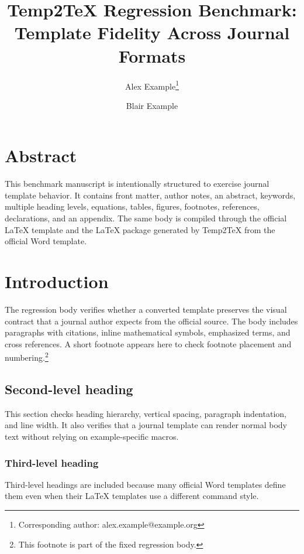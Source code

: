 \title{Temp2TeX Regression Benchmark: Template Fidelity Across Journal Formats}
\author{Alex Example\thanks{Corresponding author: alex.example@example.org} \and Blair Example}
\date{}
\maketitle

\section*{Abstract}
This benchmark manuscript is intentionally structured to exercise journal template behavior. It contains front matter, author notes, an abstract, keywords, multiple heading levels, equations, tables, figures, footnotes, references, declarations, and an appendix. The same body is compiled through the official LaTeX template and the LaTeX package generated by Temp2TeX from the official Word template.


\section{Introduction}
The regression body verifies whether a converted template preserves the visual contract that a journal author expects from the official source. The body includes paragraphs with citations, inline mathematical symbols, emphasized terms, and cross references. A short footnote appears here to check footnote placement and numbering.\footnote{This footnote is part of the fixed regression body.}

\subsection{Second-level heading}
This section checks heading hierarchy, vertical spacing, paragraph indentation, and line width. It also verifies that a journal template can render normal body text without relying on example-specific macros.

\subsubsection{Third-level heading}
Third-level headings are included because many official Word templates define them even when their LaTeX templates use a different command style.

